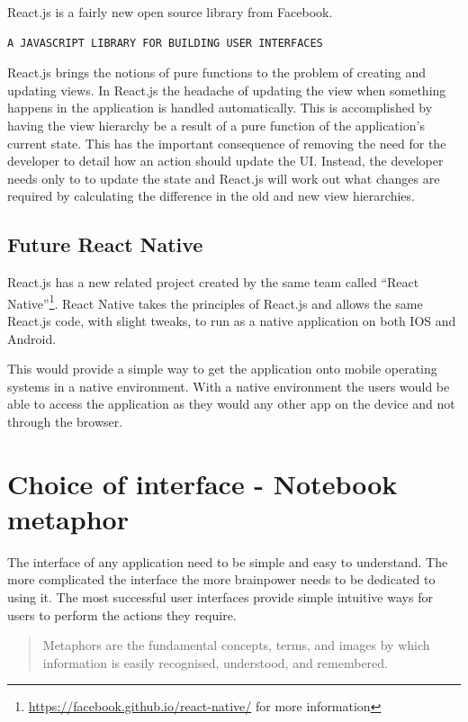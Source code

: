 React.js is a fairly new open source library from Facebook.

\begin{verbatim}
A JAVASCRIPT LIBRARY FOR BUILDING USER INTERFACES
\end{verbatim}\cite{reactjs}

React.js brings the notions of pure functions to the problem of creating and
updating views. In React.js the headache of updating the view when something
happens in the application is handled automatically. This is accomplished by
having the view hierarchy be a result of a pure function of the application's
current state. This has the important consequence of removing the need for the
developer to detail how an action should update the UI. Instead, the developer
needs only to to update the state and React.js will work out what changes are
required by calculating the difference in the old and new view hierarchies.

\subsection{Future React Native}\label{future-react-native}

React.js has a new related project created by the same team called ``React
Native''\footnote{\url{https://facebook.github.io/react-native/} for more
information}. React Native takes the principles of React.js and allows the same
React.js code, with slight tweaks, to run as a native application on both IOS
and Android.

This would provide a simple way to get the application onto mobile operating systems in a
native environment. With a native environment the users would be able to access the application
as they would any other app on the device and not through the browser.

\section{Choice of interface - Notebook
metaphor}\label{choice-of-interface---notebook-metaphor}

The interface of any application need to be simple and easy to
understand. The more complicated the interface the more brainpower needs
to be dedicated to using it. The most successful user interfaces provide
simple intuitive ways for users to perform the actions they require.

\blockquote{%
  Metaphors are the fundamental concepts, terms, and images by which information
  is easily recognised, understood, and remembered.%
}

